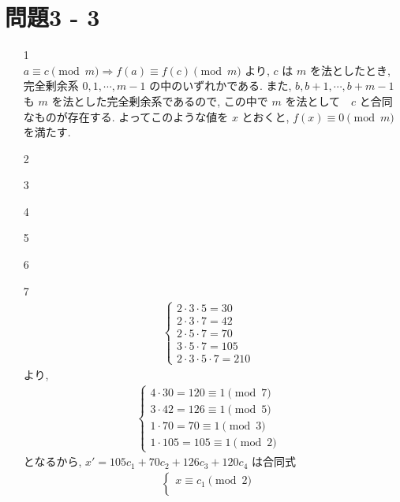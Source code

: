 \documentclass[12pt,a4paper]{jsarticle}
\begin{document}
\section*{問題3 - 3}
\begin{enumerate}
 \item[1]  \mbox{} \\
	$a \equiv c \pmod{m} \Rightarrow f(a) \equiv f(c) \pmod{m}$
	より, $c$ は $m$ を法としたとき, 完全剰余系 $0, 1, \cdots , m-1$ の中のいずれかである. 		また, $b, b+1, \cdots, b+m-1$ も $m$ を法とした完全剰余系であるので, この中で $m$ を法として　$c$ と合同なものが存在する. よってこのような値を $x$ とおくと, $f(x) \equiv 0 \pmod{m}$ を満たす. 
\item[2]  \mbox{} \\
 \item[3]  \mbox{} \\
 \item[4]  \mbox{} \\
 \item[5]  \mbox{} \\
 \item[6]  \mbox{} \\
 \item[7]  \mbox{} \\
	\begin{align*}
		\begin{cases}
			2 \cdot 3 \cdot 5 = 30 & \\
			2 \cdot 3 \cdot 7 = 42 & \\
			2 \cdot 5 \cdot 7 = 70 & \\
			3 \cdot 5 \cdot 7 = 105 & \\
			2 \cdot 3 \cdot 5 \cdot 7 = 210
		\end{cases}
	\end{align*}
	より,
	\begin{align*}
		\begin{cases}
			4 \cdot 30 = 120 \equiv 1 \pmod{7} & \\
			3 \cdot 42 = 126 \equiv 1 \pmod{5} & \\
			1 \cdot 70 = 70 \equiv 1 \pmod{3} & \\
			1 \cdot 105 = 105 \equiv 1 \pmod{2}
		\end{cases}
	\end{align*}
	となるから, $x' = 105c_1 + 70c_2 + 126c_3 + 120c_4$ は合同式
	\begin{align*}
		\begin{cases}
			x \equiv c_1 \pmod{2} & \\

\end{cases}
\end{align*}
\end{enumerate}
\end{document}
